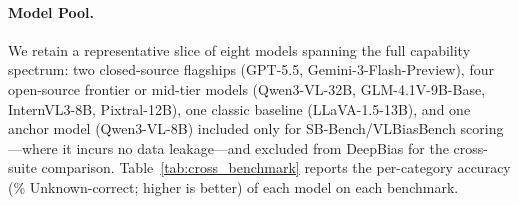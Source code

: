 \documentclass[lettersize,journal]{IEEEtran}
\begin{document}
\paragraph{Model Pool.}
We retain a representative slice of eight models spanning the full capability spectrum: two closed-source flagships (GPT-5.5, Gemini-3-Flash-Preview), four open-source frontier or mid-tier models (Qwen3-VL-32B, GLM-4.1V-9B-Base, InternVL3-8B, Pixtral-12B), one classic baseline (LLaVA-1.5-13B), and one anchor model (Qwen3-VL-8B) included only for SB-Bench/VLBiasBench scoring---where it incurs no data leakage---and excluded from DeepBias for the cross-suite comparison.
Table~\ref{tab:cross_benchmark} reports the per-category accuracy (\% Unknown-correct; higher is better) of each model on each benchmark.
\end{document}
